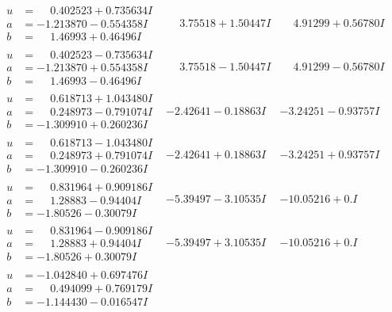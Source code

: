 \documentclass[1p]{elsarticle_modified}
\theoremstyle{definition}
\begin{document}
$$\begin{array}{c|c|c}
\begin{aligned}
u &= \phantom{-}0.402523 + 0.735634 I \\
a &= -1.213870 - 0.554358 I \\
b &= \phantom{-}1.46993 + 0.46496 I\end{aligned}
 & \phantom{-}3.75518 + 1.50447 I & \phantom{-}4.91299 + 0.56780 I \\ \hline\begin{aligned}
u &= \phantom{-}0.402523 - 0.735634 I \\
a &= -1.213870 + 0.554358 I \\
b &= \phantom{-}1.46993 - 0.46496 I\end{aligned}
 & \phantom{-}3.75518 - 1.50447 I & \phantom{-}4.91299 - 0.56780 I \\ \hline\begin{aligned}
u &= \phantom{-}0.618713 + 1.043480 I \\
a &= \phantom{-}0.248973 - 0.791074 I \\
b &= -1.309910 + 0.260236 I\end{aligned}
 & -2.42641 - 0.18863 I & -3.24251 - 0.93757 I \\ \hline\begin{aligned}
u &= \phantom{-}0.618713 - 1.043480 I \\
a &= \phantom{-}0.248973 + 0.791074 I \\
b &= -1.309910 - 0.260236 I\end{aligned}
 & -2.42641 + 0.18863 I & -3.24251 + 0.93757 I \\ \hline\begin{aligned}
u &= \phantom{-}0.831964 + 0.909186 I \\
a &= \phantom{-}1.28883 - 0.94404 I \\
b &= -1.80526 - 0.30079 I\end{aligned}
 & -5.39497 - 3.10535 I & -10.05216 + 0. I\phantom{ +0.000000I} \\ \hline\begin{aligned}
u &= \phantom{-}0.831964 - 0.909186 I \\
a &= \phantom{-}1.28883 + 0.94404 I \\
b &= -1.80526 + 0.30079 I\end{aligned}
 & -5.39497 + 3.10535 I & -10.05216 + 0. I\phantom{ +0.000000I} \\ \hline\begin{aligned}
u &= -1.042840 + 0.697476 I \\
a &= \phantom{-}0.494099 + 0.769179 I \\
b &= -1.144430 - 0.016547 I\end{aligned}

\end{array}$$
\end{document}
